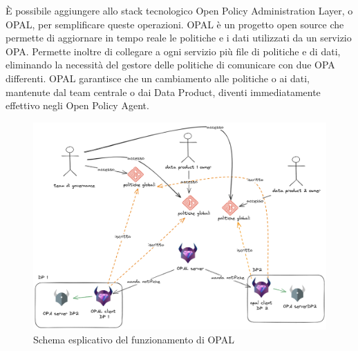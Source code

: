 \documentclass[a4paper,12pt]{report}
\begin{document}
È possibile aggiungere allo stack tecnologico Open Policy Administration Layer, o OPAL, per semplificare queste operazioni.
OPAL è un progetto open source che permette di aggiornare in tempo reale le politiche e i dati utilizzati da un servizio OPA.
Permette inoltre di collegare a ogni servizio più file di politiche e di dati, eliminando la necessità del gestore delle politiche di comunicare con due OPA differenti.
OPAL garantisce che un cambiamento alle politiche o ai dati, mantenute dal team centrale o dai Data Product, diventi immediatamente effettivo negli Open Policy Agent.
\begin{figure}[H]
    \centering
    \includegraphics[width=\linewidth]{immagini/OPAL funzionamento.png}
    \caption{Schema esplicativo del funzionamento di OPAL}
    \label{funzionamento_OPAL}
\end{figure}
\end{document}
